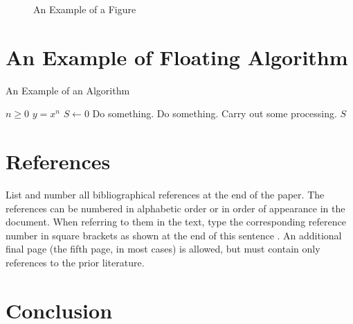 \documentclass{article}
\begin{document}
\begin{figure}[t]
\begin{minipage}[b]{.3\hsize}
      \label{Fig:Example:C}
   \end{minipage}
   \caption{An Example of a Figure}
   \label{Fig:Example}
\end{figure}

\section{An Example of Floating Algorithm}
\lipsum[5-6]

\begin{algorithm}[t]
   \caption{An Example of an Algorithm}
   \begin{algorithmic}[1]
      \REQUIRE $n\geq0$
      \ENSURE $y=x^n$
      \STATE $S\leftarrow0$
         \STATE Do something.
      \ELSE
         \STATE Do something.
      \ENDIF
         \STATE Carry out some processing.
      \ENDFOR
      \RETURN $S$
   \end{algorithmic}
\end{algorithm}


\balance

\section{References}
\label{sec:ref}

List and number all bibliographical references at the end of the
paper. The references can be numbered in alphabetic order or in
order of appearance in the document. When referring to them in
the text, type the corresponding reference number in square
brackets as shown at the end of this sentence \cite{Example-Proceedings,Example-Article}.
An additional final page (the fifth page, in most cases) is allowed,
but must contain only references to the prior literature.

\section{Conclusion}
\lipsum[4]



\end{document}
